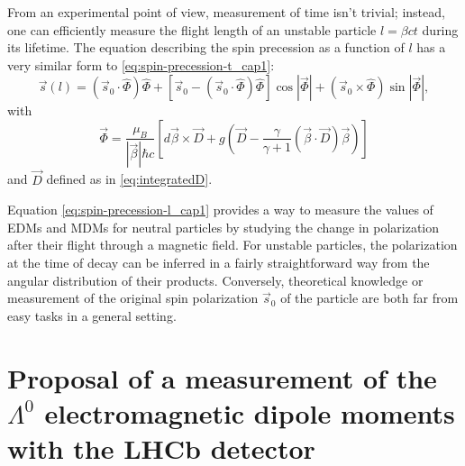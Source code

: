 From an experimental point of view, measurement of time isn't trivial;
instead, one can efficiently measure the flight length of an unstable particle $l=\beta c t$ during its lifetime.
The equation describing the spin precession as a function of $l$ has a very similar form to \eqref{eq:spin-precession-t_cap1}:
\begin{equation}
	\vec{s} \left(
		l
	\right) =
	\left(
		\vec{s}_0 \cdot \hat{\Phi}
	\right) \hat{\Phi}
	+
	\left[
		\vec{s}_0 - \left(
			\vec{s}_0 \cdot \hat{\Phi}
		\right) \hat{\Phi}
	\right]
	\cos \left \lvert
		\vec{\Phi}
	\right\rvert
	+
	\left(
		\vec{s}_0 \times \hat{\Phi}
	\right)
	\sin \left \lvert
		\vec{\Phi}
	\right \rvert,
\label{eq:spin-precession-l_cap1}
\end{equation}
with
\begin{equation}
\vec{\Phi} = \frac{\mu_B}{|\vec{\beta}|\hbar c}
\left[
	d\vec{\beta} \times \vec{D}
	+
	g\left(
	\vec{D} - \frac{\gamma}{\gamma+1}(\vec{\beta} \cdot \vec{D}) \vec{\beta}
	\right)
\right]
\end{equation}
and $\vec{D}$ defined as in \eqref{eq:integratedD}.

Equation \eqref{eq:spin-precession-l_cap1} provides a way to measure the values of EDMs and MDMs for neutral particles by studying the change in polarization after their flight through a magnetic field.
For unstable particles, the polarization at the time of decay can be inferred in a fairly straightforward way from the angular distribution of their products.
Conversely, theoretical knowledge or measurement of the original spin polarization $\vec{s}_0$ of the particle are both far from easy tasks in a general setting.

\section{Proposal of a measurement of the \texorpdfstring{$\Lambda^0$}{Lambda} electromagnetic dipole moments with the LHCb detector}
\label{sec:lambda}

